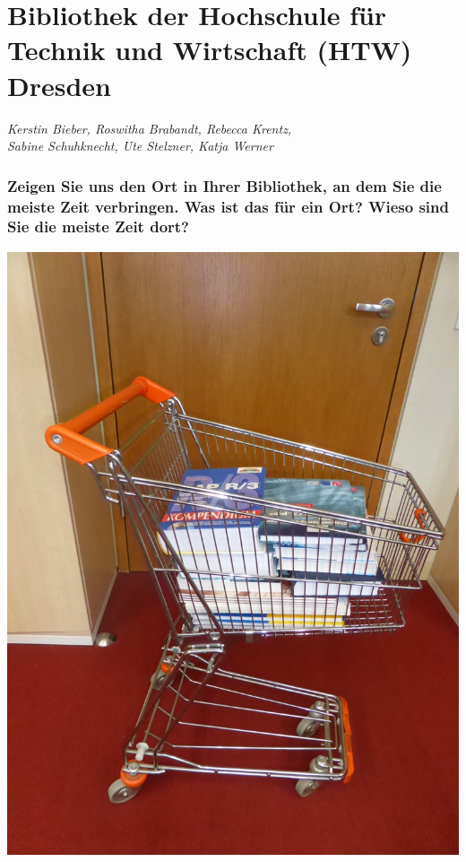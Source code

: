 
\vspace*{.5cm}
\section{Bibliothek der Hochschule für Technik und Wirtschaft (HTW) Dresden}
\begin{center}
\emph{Kerstin Bieber, Roswitha Brabandt, Rebecca Krentz,\\ Sabine Schuhknecht, Ute Stelzner, Katja Werner}
\end{center}
\vspace*{1cm}

\hypertarget{zeigen-sie-uns-den-ort-in-ihrer-bibliothek-an-dem-sie-die-meiste-zeit-verbringen.-was-ist-das-fuxfcr-ein-ort-wieso-sind-sie-die-meiste-zeit-dort}{%
\subsubsection{Zeigen Sie uns den Ort in Ihrer Bibliothek, an dem Sie die
meiste Zeit verbringen. Was ist das für ein Ort? Wieso sind Sie die
meiste Zeit
dort?}\label{zeigen-sie-uns-den-ort-in-ihrer-bibliothek-an-dem-sie-die-meiste-zeit-verbringen.-was-ist-das-fuxfcr-ein-ort-wieso-sind-sie-die-meiste-zeit-dort}}

\begin{center}
\includegraphics{htw-dresden/img/Einkaufswagen.jpg}
\end{center}

